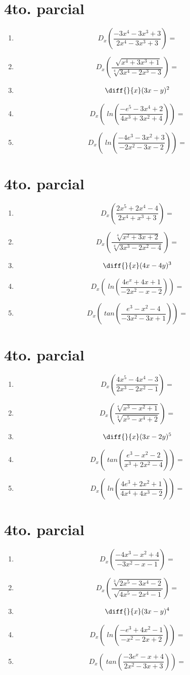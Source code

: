 \documentclass[oneside,spanish,letter]{article}
\begin{document}
\section{4to. parcial}
\begin{enumerate}
 \item $$ D_x \left( \frac{-3x^4-3x^3+3}{2x^4-3x^3+3}\right)=$$
 \item $$ D_x \left( \frac{\sqrt[]{x^4+3x^3+1}}{\sqrt[4]{3x^4-2x^3-3}}\right)=$$
\item $$\diff{}{x}(3x-y)^2$$
 \item $$ D_x \left(\;ln\left( \frac{-e^5-3x^4+2}{4x^3+3x^2+4}\right)\right)=$$
 \item $$ D_x \left(\;ln\left( \frac{-4e^3-3x^2+3}{-2x^2-3x-2}\right)\right)=$$
 \end{enumerate}
  \newpage
\section{4to. parcial}
\begin{enumerate}
 \item $$ D_x \left( \frac{2x^5+2x^4-4}{2x^4+x^3+3}\right)=$$
 \item $$ D_x \left( \frac{\sqrt[4]{x^2+3x+2}}{\sqrt[4]{3x^3-2x^2-4}}\right)=$$
\item $$\diff{}{x}(4x-4y)^3$$
 \item $$ D_x \left(\;ln\left( \frac{4e^x+4x+1}{-2x^2-x-2}\right)\right)=$$
 \item $$ D_x \left(\;tan\left( \frac{e^3-x^2-4}{-3x^2-3x+1}\right)\right)=$$
 \end{enumerate}
  \newpage
\section{4to. parcial}
\begin{enumerate}
 \item $$ D_x \left( \frac{4x^5-4x^4-3}{2x^3-2x^2-1}\right)=$$
 \item $$ D_x \left( \frac{\sqrt[4]{x^3-x^2+1}}{\sqrt[3]{x^5-x^4+2}}\right)=$$
\item $$\diff{}{x}(3x-2y)^5$$
 \item $$ D_x \left(\;tan\left( \frac{e^3-x^2-2}{x^3+2x^2-4}\right)\right)=$$
 \item $$ D_x \left(\;ln\left( \frac{4e^3+2x^2+1}{4x^4+4x^3-2}\right)\right)=$$
 \end{enumerate}
  \newpage
\section{4to. parcial}
\begin{enumerate}
 \item $$ D_x \left( \frac{-4x^3-x^2+4}{-3x^2-x-1}\right)=$$
 \item $$ D_x \left( \frac{\sqrt[3]{2x^5-3x^4-2}}{\sqrt[]{4x^5-2x^4-1}}\right)=$$
\item $$\diff{}{x}(3x-y)^4$$
 \item $$ D_x \left(\;ln\left( \frac{-e^3+4x^2-1}{-x^2-2x+2}\right)\right)=$$
 \item $$ D_x \left(\;tan\left( \frac{-3e^x-x+4}{2x^2-3x+3}\right)\right)=$$
 \end{enumerate}
  \newpage
\end{document}
